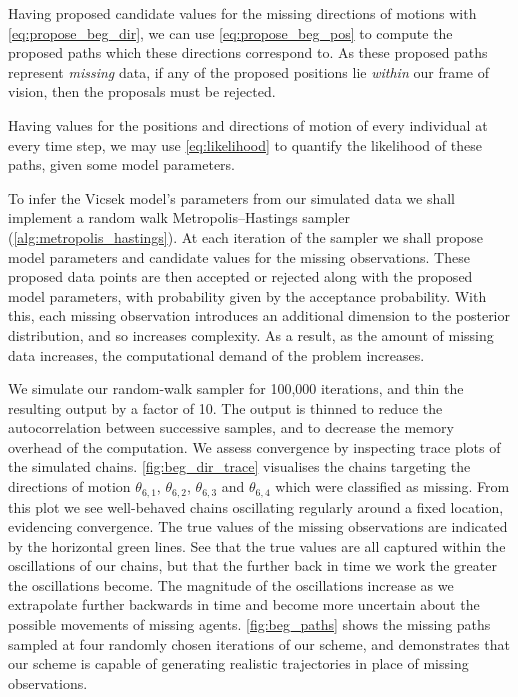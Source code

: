 Having proposed candidate values for the missing directions of motions with
\cref{eq:propose_beg_dir}, we can use \cref{eq:propose_beg_pos} to compute the
proposed paths which these directions correspond to. As these proposed
paths represent \emph{missing} data, if any of the proposed positions lie
\emph{within} our frame of vision, then the proposals must be rejected.

Having values for the positions and directions of motion of every individual at
every time step, we may use \cref{eq:likelihood} to quantify the likelihood of
these paths, given some model parameters.

To infer the Vicsek model's parameters from our simulated data we shall
implement a random walk Metropolis--Hastings sampler
(\cref{alg:metropolis_hastings}). At each iteration of the sampler we shall
propose model parameters and candidate values for the missing observations.
These proposed data points are then accepted or rejected along with the
proposed model parameters, with probability given by the acceptance
probability. With this, each missing observation introduces an additional
dimension to the posterior distribution, and so increases complexity. As a
result, as the amount of missing data increases, the computational demand
of the problem increases.

We simulate our random-walk sampler for 100,000 iterations, and thin the
resulting output by a factor of 10. The output is thinned to reduce the
autocorrelation between successive samples, and to decrease the memory overhead
of the computation. We assess convergence by inspecting trace plots of the
simulated chains. \cref{fig:beg_dir_trace} visualises the chains targeting the
directions of motion $\theta_{6,1}$, $\theta_{6,2}$, $\theta_{6,3}$ and
$\theta_{6,4}$ which were classified as missing. From this plot we see
well-behaved chains oscillating regularly around a fixed location, evidencing
convergence. The true values of the missing observations are indicated by the
horizontal green lines. See that the true values are all captured within the
oscillations of our chains, but that the further back in time we work the
greater the oscillations become. The magnitude of the oscillations increase as
we extrapolate further backwards in time and become more uncertain about the
possible movements of missing agents. \cref{fig:beg_paths} shows the missing
paths sampled at four randomly chosen iterations of our scheme, and
demonstrates that our scheme is capable of generating realistic trajectories in
place of missing observations.

